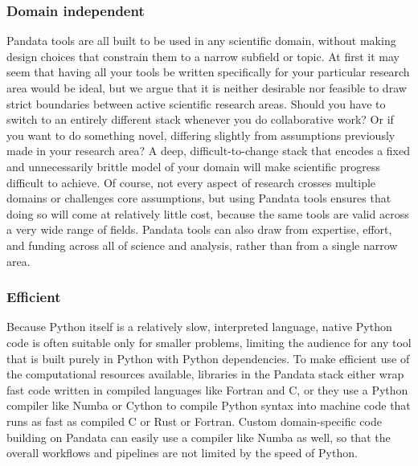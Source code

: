 \subsubsection{Domain independent}
Pandata tools are all built to be used in any scientific domain, without making design choices that constrain them to a narrow subfield or topic. At first it may seem that having all your tools be written specifically for your particular research area would be ideal, but we argue that it is neither desirable nor feasible to draw strict boundaries between active scientific research areas. Should you have to switch to an entirely different stack whenever you do collaborative work? Or if you want to do something novel, differing slightly from assumptions previously made in your research area? A deep, difficult-to-change stack that encodes a fixed and unnecessarily brittle model of your domain will make scientific progress difficult to achieve. Of course, not every aspect of research crosses multiple domains or challenges core assumptions, but using Pandata tools ensures that doing so will come at relatively little cost, because the same tools are valid across a very wide range of fields. Pandata tools can also draw from expertise, effort, and funding across all of science and analysis, rather than from a single narrow area.

\subsubsection{Efficient}
Because Python itself is a relatively slow, interpreted language, native Python code is often suitable only for smaller problems, limiting the audience for any tool that is built purely in Python with Python dependencies. To make efficient use of the computational resources available, libraries in the Pandata stack either wrap fast code written in compiled languages like Fortran and C, or they use a Python compiler like Numba \citep{lam:llvm15} or Cython \citep{behnel:cse11} to compile Python syntax into machine code that runs as fast as compiled C or Rust or Fortran. Custom domain-specific code building on Pandata can easily use a compiler like Numba as well, so that the overall workflows and pipelines are not limited by the speed of Python.

